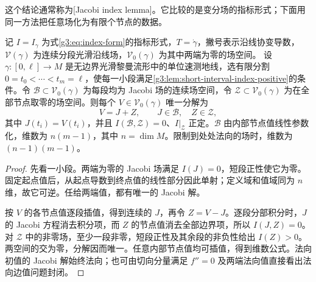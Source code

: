 这个结论通常称为[Jacobi index lemma]。它比较的是变分场的指标形式；下面用同一方法把任意场化为有限个节点的数据。

\begin{proposition}\label{g3:prop:piecewise-jacobi-decomposition}
	记 \(I=I_\gamma\) 为式\eqref{g3:eq:index-form}的指标形式，\(T=\dot\gamma\)，撇号表示沿线协变导数，\(\mathcal V(\gamma)\) 为连续分段光滑沿线场，\(\mathcal V_0(\gamma)\) 为其中两端为零的场空间。
	设 \(\gamma:[0,\ell]\to M\) 是无边界光滑黎曼流形中的单位速测地线，选有限分割 \(0=t_0<\cdots<t_m=\ell\)，使每一小段满足\cref{g3:lem:short-interval-index-positive}的条件。令 \(\mathcal B\subset\mathcal V_0(\gamma)\) 为每段均为 Jacobi 场的连续场空间，令 \(\mathcal Z\subset\mathcal V_0(\gamma)\) 为在全部节点取零的场空间。则每个 \(V\in\mathcal V_0(\gamma)\) 唯一分解为
	\[
		V=J+Z,\qquad J\in\mathcal B,\quad Z\in\mathcal Z,
	\]
	其中 \(J(t_i)=V(t_i)\)，并且 \(I(\mathcal B,\mathcal Z)=0\)、\(I|_{\mathcal Z}\) 正定。\(\mathcal B\) 由内部节点值线性参数化，维数为 \(n(m-1)\)，其中 \(n=\dim M\)。限制到处处法向的场时，维数为 \((n-1)(m-1)\)。
\end{proposition}
\begin{proof}
	先看一小段。两端为零的 Jacobi 场满足 \(I(J)=0\)，短段正性使它为零。固定起点值后，从起点导数到终点值的线性部分因此单射；定义域和值域同为 \(n\) 维，故它可逆。任给两端值，都有唯一的 Jacobi 解。

	按 \(V\) 的各节点值逐段插值，得到连续的 \(J\)，再令 \(Z=V-J\)。逐段分部积分时，\(J\) 的 Jacobi 方程消去积分项，而 \(Z\) 的节点值消去全部边界项，所以 \(I(J,Z)=0\)。对 \(\mathcal Z\) 中的非零场，至少一段非零，短段正性及其余段的非负性给出 \(I(Z)>0\)。两空间的交为零，分解因而唯一。任意内部节点值均可插值，得到维数公式。法向初值的 Jacobi 解始终法向；也可由切向分量满足 \(f''=0\) 及两端法向值直接看出法向边值问题封闭。
\end{proof}


